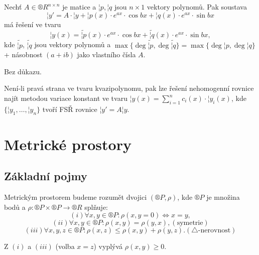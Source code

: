 \documentclass[12pt]{article}                   %
\begin{document}
        \begin{veta}
            Nechť $A \in ®R^{n \times n}$ je matice a $¦p, ¦q$ jsou $n\times 1$ vektory polynomů. Pak soustava
            $$¦y' = A·¦y + ¦p(x)·e^{ax}·\cos bx + ¦q(x)·e^{ax}·\sin bx $$
            má řešení ve tvaru
            $$ ¦y(x) = \tilde{¦p}(x)·e^{ax}·\cos bx + \tilde{¦q}(x)·e^{ax}·\sin bx, $$ 
            kde $\tilde{¦p}$, $\tilde{¦q}$ jsou vektory polynomů a $\max\{\deg \tilde{¦p}, \deg \tilde{¦q}\} = \max \{\deg ¦p, \deg ¦q\}$ + násobnost $(a + ib)$ jako vlastního čísla $A$.

            \begin{dukazin}
                Bez důkazu.
            \end{dukazin}
        \end{veta}

        \begin{poznamka}
            Není-li pravá strana ve tvaru kvazipolynomu, pak lze řešení nehomogenní rovnice najít metodou variace konstant ve tvaru $¦y(x) = \sum_{i = 1}^n c_i(x)·¦y_i(x)$, kde $\{¦y_1, …, ¦y_n\}$ tvoří FSŘ rovnice $¦y' = A¦y$.
        \end{poznamka}


\section{Metrické prostory}
    \subsection{Základní pojmy}
        \begin{definice}
            Metrickým prostorem budeme rozumět dvojici $(®P, \rho)$, kde $®P$ je množina bodů a $\rho: ®P \times ®P \rightarrow ®R$ splňuje:
            $$ (i) \forall x, y \in ®P: \rho(x, y = 0) \Leftrightarrow x = y, $$ 
            $$ (ii) \forall x, y \in ®P: \rho(x, y) = \rho(y, x), (\text{symetrie}) $$
            $$ (iii) \forall x, y, z \in ®P: \rho(x, z) ≤ \rho(x, y) + \rho(y, z). (\triangle\text{-nerovnost}) $$ 
        \end{definice}

        \begin{poznamka}
            Z $(i)$ a $(iii)$ (volba $x = z$) vyplývá $\rho(x, y) ≥ 0$.
        \end{poznamka}
\end{document}
